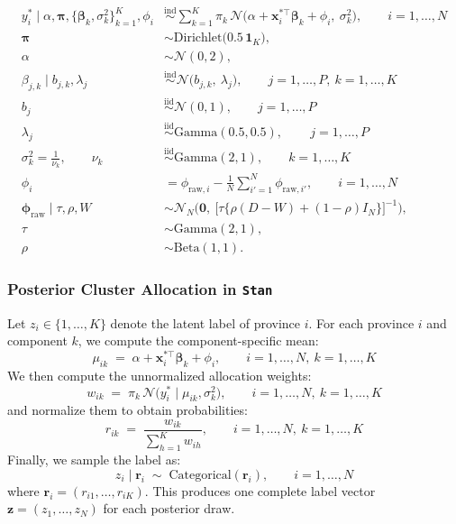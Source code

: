 \begin{align*}
y_i^\ast \mid \alpha,\boldsymbol{\pi},\{\boldsymbol{\beta}_k,\sigma_k^2\}_{k=1}^K,\phi_i
&\stackrel{\text{ind}}{\sim} \sum_{k=1}^K \pi_k\,
\mathcal{N}\!\Big(\alpha+\mathbf{x}_i^{\ast\top}\boldsymbol{\beta}_k+\phi_i,\ \sigma_k^2\Big),
\qquad i=1,\dots,N\\[2mm]
\boldsymbol{\pi} &\sim \mathrm{Dirichlet}\!\big(0.5\,\mathbf{1}_K\big),\\
\alpha &\sim \mathcal{N}(0,2),\\
\beta_{j,k}\mid b_{j,k},\lambda_{j}
&\stackrel{\text{ind}}{\sim} \mathcal{N}\!\Big(b_{j,k},\ \lambda_{j} \Big),
\qquad j=1,\dots,P,\ k=1,\dots,K\\
b_{j} &\stackrel{\text{iid}}{\sim} \mathcal{N}(0,1),
\qquad j=1,\dots,P\\
\lambda_{j} &\stackrel{\text{iid}}{\sim} \mathrm{Gamma}(0.5,0.5), \,
\qquad j=1,\dots,P\\
\sigma^2_k = \frac{1}{\nu_k}, \qquad \nu_k &\stackrel{\text{iid}}{\sim} \mathrm{Gamma}(2,1),
\qquad k=1,\dots,K\\
\phi_i &= \phi_{\mathrm{raw},i}-\frac1N\sum_{i'=1}^N \phi_{\mathrm{raw},i'},
\qquad i=1,\dots,N\\
\boldsymbol{\phi}_{\mathrm{raw}}\mid \tau,\rho,W
&\sim \mathcal{N}_N\!\Big(
\mathbf{0},\ \big[\tau\{\rho(D-W)+(1-\rho)I_N\}\big]^{-1}
\Big),\\
\tau &\sim \mathrm{Gamma}(2,1),\\
\rho &\sim \mathrm{Beta}(1,1).
\end{align*}

\subsubsection{Posterior Cluster Allocation in \texttt{Stan}}
Let $z_i \in \{1,\dots,K\}$ denote the latent label of province $i$. For each province $i$ and component $k$, we compute the component-specific mean:
\[
\mu_{ik} \;=\; \alpha + \mathbf{x}_i^{*\top}\boldsymbol{\beta}_k + \phi_i, \qquad i=1,\dots,N,\ k=1,\dots,K
\]
We then compute the unnormalized allocation weights:
\[
w_{ik} \;=\; \pi_k\, \mathcal{N}\!\big(y_i^* \mid \mu_{ik}, \sigma_k^2\big), 
\qquad i=1,\dots,N,\ k=1,\dots,K
\]
and normalize them to obtain probabilities:
\[
r_{ik} \;=\; \frac{w_{ik}}{\sum_{h=1}^K w_{ih}},
\qquad i=1,\dots,N,\ k=1, \dots,K
\]
Finally, we sample the label as:
\[
z_i \mid \mathbf{r}_i \;\sim\; \mathrm{Categorical}(\mathbf{r}_i),
\qquad i=1,\dots,N
\]
where $\mathbf{r}_i=(r_{i1},\dots,r_{iK})$.
This produces one complete label vector $\mathbf{z}=(z_1,\dots,z_N)$ for each posterior draw.

